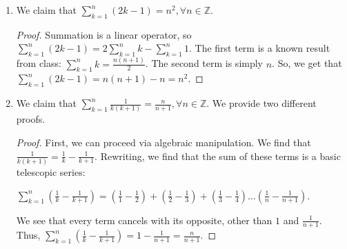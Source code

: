 \documentclass[12pt]{article}
\begin{document}
\begin{enumerate}[start = 1, label = {\bfseries Question \arabic*:}, leftmargin=1in]
       \item We claim that $\sum\limits_{k=1}^{n}(2k-1) = n^2, \forall n\in \mathbb{Z}$.\begin{proof}
            Summation is a linear operator, so $\sum\limits_{k=1}^{n}(2k-1) = 2\sum\limits_{k=1}^{n}k - \sum\limits_{k=1}^{n}1$. The first term 
            is a known result from class: $\sum\limits_{k=1}^{n}k = \frac{n(n+1)}{2}$. The second term is simply $n$. So, we get that $\sum\limits_{k=1}^{n}(2k-1)=n(n+1)-n=n^2$.
       \end{proof}

       \item We claim that $\sum\limits_{k=1}^{n}\frac{1}{k(k+1)} = \frac{n}{n+1}, \forall n\in \mathbb{Z}$. We provide two different proofs. \begin{proof}
        First, we can proceed via algebraic manipulation. We find that $\frac{1}{k(k+1)} = \frac{1}{k}-\frac{1}{k+1}$. Rewriting, we find that the sum of these terms is a basic telescopic series: \begin{center}
            $\sum\limits_{k=1}^{n}(\frac{1}{k} - \frac{1}{k+1})=(\frac{1}{1} - \frac{1}{2})+(\frac{1}{2}-\frac{1}{3})+(\frac{1}{3}-\frac{1}{4})\ldots (\frac{1}{n}-\frac{1}{n+1})$.
        \end{center} We see that every term cancels with its opposite, other than $1$ and $\frac{1}{n+1}$. Thus, $\sum\limits_{k=1}^{n}(\frac{1}{k} - \frac{1}{k+1})=1-\frac{1}{n+1}=\frac{n}{n+1}$.
       \end{proof}


\end{enumerate}
\end{document}
